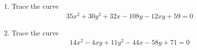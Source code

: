 \renewcommand{\theequation}{\theenumi}
\renewcommand{\thefigure}{\theenumi}
\begin{enumerate}[label=\thesubsection.\arabic*.,ref=\thesubsection.\theenumi]
%
\item Trace the curve
\begin{align}
35x^2+30y^2+32x-108y-12xy+59=0 \label{eq:solutions/41/ex/given_curve_eq}
\end{align}
%
\solution

\item Trace the curve
\begin{align}
14x^2 - 4xy + 11y^2 - 44x - 58y + 71 =0  \label{eq:solutions/41/ex1/given_curve_eq}
\end{align}

\solution


\end{enumerate}
